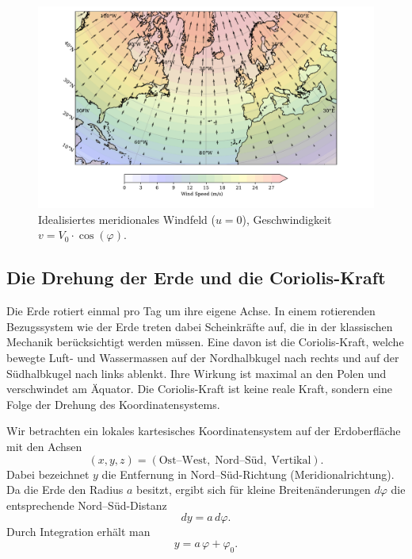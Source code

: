 \begin{figure}
	\centering
	\includegraphics[width=\textwidth, trim=1cm 0cm 2cm 0cm, clip]{papers/rossby/images/meridional_wind_plot.pdf}
	\caption{Idealisiertes meridionales Windfeld (\(u=0\)), Geschwindigkeit \(v = V_0 \cdot \cos(\varphi)\).}
	\label{fig:meridional_wind}
\end{figure}

\subsection{Die Drehung der Erde und die Coriolis-Kraft}

Die Erde rotiert einmal pro Tag um ihre eigene Achse. In einem rotierenden
Bezugssystem wie der Erde treten dabei Scheinkräfte auf, die in der klassischen
Mechanik berücksichtigt werden müssen. Eine davon ist die {Coriolis-Kraft},
welche bewegte Luft- und Wassermassen auf der {Nordhalbkugel} nach rechts und
auf der {Südhalbkugel} nach links ablenkt. Ihre Wirkung ist maximal an den
Polen und verschwindet am Äquator. Die Coriolis-Kraft ist keine reale Kraft,
sondern eine Folge der Drehung des Koordinatensystems.

Wir betrachten ein lokales kartesisches Koordinatensystem auf der Erdoberfläche
mit den Achsen
\begin{equation}
	(x,y,z) = (\text{Ost–West}, \; \text{Nord–Süd}, \; \text{Vertikal}).
\end{equation}
Dabei bezeichnet \(y\) die Entfernung in Nord–Süd-Richtung (Meridionalrichtung).
Da die Erde den Radius \(a\) besitzt, ergibt sich für kleine Breitenänderungen \(d\varphi\) die entsprechende Nord–Süd-Distanz
\begin{equation}
	dy = a \, d\varphi.
\end{equation}
Durch Integration erhält man
\begin{equation}
	y = a \, \varphi + \varphi_0.
\end{equation}

